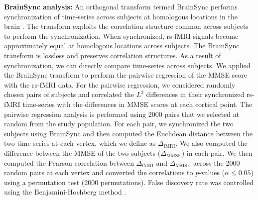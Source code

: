 \documentclass[review,3p,times,12pt,letterpaper]{elsarticle}
\begin{document}
\noindent\textbf{BrainSync analysis:}
An orthogonal transform termed BrainSync performs synchronization of time-series across subjects at homologous locations in the brain \cite{JOSHI2018740}. The transform exploits the correlation structure common across subjects to perform the synchronization. When synchronized, rs-fMRI signals become approximately equal at homologous locations across subjects. The BrainSync transform is lossless and preserves correlation structures. As a result of synchronization, we can directly compare time-series across subjects. 
 We applied the BrainSync transform to perform the pairwise regression \cite{joshi_pairwise_2021} of the MMSE score with the rs-fMRI data. For the pairwise regression, we considered randomly chosen pairs of subjects and correlated the $L^2$ differences in their synchronized rs-fMRI time-series with the differences in MMSE scores at each cortical point.
The pairwise regression analysis is performed using 2000 pairs that we selected at random from the study population. For each pair, we synchronized the two subjects using BrainSync and then computed the Euclidean distance between the two time-series at each vertex, which we define as $\Delta_{\mathrm{fMRI}}$. We also computed the difference between the MMSE of the two subjects ($\Delta_{\mathrm{MMSE}}$) in each pair. We then computed the Pearson correlation between $\Delta_{\mathrm{fMRI}}$ and $\Delta_{\mathrm{MMSE}}$ across the 2000 random pairs at each vertex and converted the correlations to $p$-values ($\alpha \leq 0.05$) using a permutation test (2000 permutations). False discovery rate was controlled using the Benjamini-Hochberg method \cite{Benjamini_1995_Controlling_false_discovery}.

\end{document}
